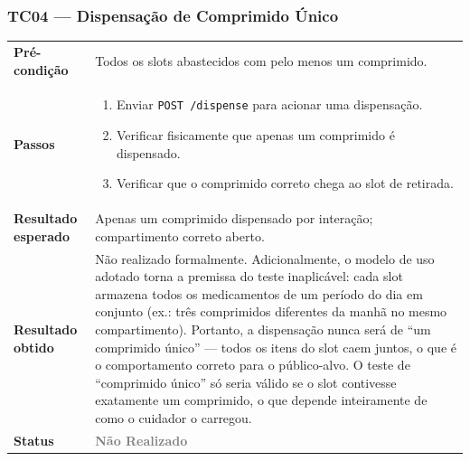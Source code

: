 \documentclass[12pt,a4paper]{article}
\newcommand{\lightrule}{\arrayrulecolor{gray!35}\midrule\arrayrulecolor{black}}
\newcommand{\naorealizado}{\textcolor{gray}{\textbf{Não Realizado}}}
\begin{document}
\subsubsection{TC04 — Dispensação de Comprimido Único}
\begin{table}[H]\small\setlength{\tabcolsep}{6pt}\renewcommand{\arraystretch}{1.3}
\begin{tabularx}{\textwidth}{>{\bfseries}p{4cm} X}
\toprule
Pré-condição & Todos os slots abastecidos com pelo menos um comprimido. \\
\lightrule
Passos &
\begin{enumerate}[nosep,leftmargin=*]
  \item Enviar \texttt{POST /dispense} para acionar uma dispensação.
  \item Verificar fisicamente que apenas um comprimido é dispensado.
  \item Verificar que o comprimido correto chega ao slot de retirada.
\end{enumerate} \\
\lightrule
Resultado esperado & Apenas um comprimido dispensado por interação; compartimento correto aberto. \\
\lightrule
Resultado obtido & Não realizado formalmente. Adicionalmente, o modelo de uso adotado torna a premissa do teste inaplicável: cada slot armazena todos os medicamentos de um período do dia em conjunto (ex.: três comprimidos diferentes da manhã no mesmo compartimento). Portanto, a dispensação nunca será de ``um comprimido único'' — todos os itens do slot caem juntos, o que é o comportamento correto para o público-alvo. O teste de ``comprimido único'' só seria válido se o slot contivesse exatamente um comprimido, o que depende inteiramente de como o cuidador o carregou. \\
\lightrule
Status & \naorealizado \\
\bottomrule
\end{tabularx}\end{table}
\end{document}
